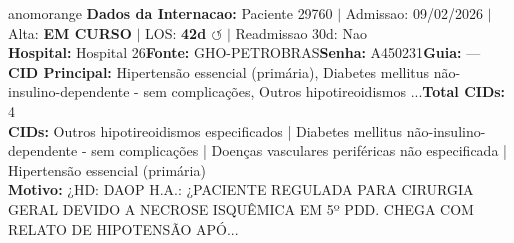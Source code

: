 \documentclass[a4paper,10pt]{article}
\begin{document}
\begin{anomalycard}[Internacao 164838 | GHO-PETROBRAS | ALTO (z=3.60)]{anomorange}
\textbf{Dados da Internacao:} Paciente 29760 $\mid$ Admissao: 09/02/2026 $\mid$ Alta: \textcolor{anomorange}{\textbf{EM CURSO}} $\mid$ LOS: \textbf{42d \textcolor{anomorange}{$\circlearrowleft$}} $\mid$ Readmissao 30d: Nao\\
\textbf{Hospital:} Hospital 26\quad\textbf{Fonte:} GHO-PETROBRAS\quad\textbf{Senha:} A450231\quad\textbf{Guia:} ---\\
\textbf{CID Principal:} {\small Hipertensão essencial (primária), Diabetes mellitus não-insulino-dependente - sem complicações, Outros hipotireoidismos ...}\quad\textbf{Total CIDs:} 4\\

\textbf{CIDs:} {\scriptsize Outros hipotireoidismos especificados | Diabetes mellitus não-insulino-dependente - sem complicações | Doenças vasculares periféricas não especificada | Hipertensão essencial (primária)}\\

\textbf{Motivo:} {\scriptsize ¿HD: DAOP  H.A.: ¿PACIENTE REGULADA PARA CIRURGIA GERAL DEVIDO A NECROSE ISQUÊMICA EM 5º PDD. CHEGA COM RELATO DE HIPOTENSÃO APÓ...}\\


\end{anomalycard}
\end{document}
